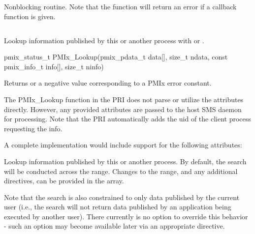 \descr

Nonblocking  routine.
Note that the function will return an error if a  callback function is given.


\subsection{}

\summary

Lookup information published by this or another process with  or .

\format

\cspecificstart
\begin{codepar}
pmix_status_t
PMIx_Lookup(pmix_pdata_t data[], size_t ndata,
            const pmix_info_t info[], size_t ninfo)
\end{codepar}
\cspecificend

\begin{arglist}
\end{arglist}

Returns  or a negative value corresponding to a PMIx error constant.

\priattr
The PMIx_Lookup function in the \ac{PRI} does not parse or utilize the attributes directly. However, any provided attributes are passed to the host \ac{SMS} daemon for processing. Note that the \ac{PRI} automatically adds the uid of the client process requesting the info.

\optattr
A complete implementation would include support for the following attributes:


\descr

Lookup information published by this or another process.
By default, the search will be conducted across the  range.
Changes to the range, and any additional directives, can be provided in the  array.

Note that the search is also constrained to only data published by the current user (i.e., the search will not return data published by an application being executed by another user).
There currently is no option to override this behavior - such an option may become available later via an appropriate  directive.

